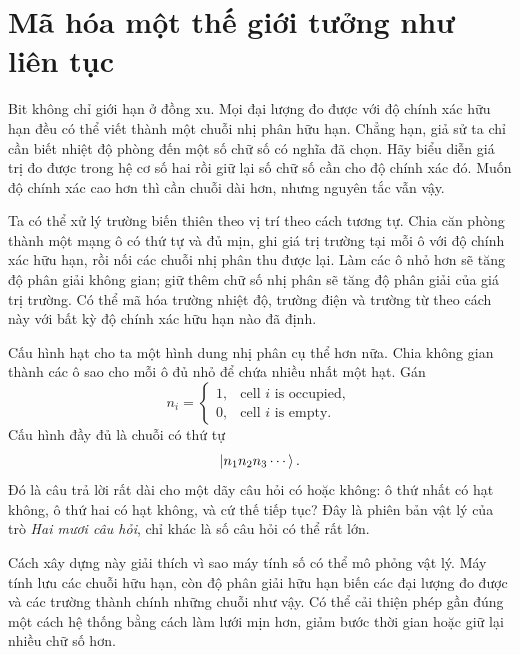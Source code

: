 \section{Mã hóa một thế giới tưởng như liên tục}

Bit không chỉ giới hạn ở đồng xu. Mọi đại lượng đo được với độ chính xác hữu hạn đều có thể viết thành một chuỗi nhị phân hữu hạn. Chẳng hạn, giả sử ta chỉ cần biết nhiệt độ phòng đến một số chữ số có nghĩa đã chọn. Hãy biểu diễn giá trị đo được trong hệ cơ số hai rồi giữ lại số chữ số cần cho độ chính xác đó. Muốn độ chính xác cao hơn thì cần chuỗi dài hơn, nhưng nguyên tắc vẫn vậy.

Ta có thể xử lý trường biến thiên theo vị trí theo cách tương tự. Chia căn phòng thành một mạng ô có thứ tự và đủ mịn, ghi giá trị trường tại mỗi ô với độ chính xác hữu hạn, rồi nối các chuỗi nhị phân thu được lại. Làm các ô nhỏ hơn sẽ tăng độ phân giải không gian; giữ thêm chữ số nhị phân sẽ tăng độ phân giải của giá trị trường. Có thể mã hóa trường nhiệt độ, trường điện và trường từ theo cách này với bất kỳ độ chính xác hữu hạn nào đã định.

Cấu hình hạt cho ta một hình dung nhị phân cụ thể hơn nữa. Chia không gian thành các ô sao cho mỗi ô đủ nhỏ để chứa nhiều nhất một hạt. Gán
\begin{equation}
  n_i=
  \begin{cases}
    1,&\text{cell \(i\) is occupied},\\
    0,&\text{cell \(i\) is empty}.
  \end{cases}
  \label{eq:l01-occupancy-bit}
\end{equation}
Cấu hình đầy đủ là chuỗi có thứ tự
\begin{equation}
  \left\lvert n_1n_2n_3\cdots\right\rangle.
\end{equation}
Đó là câu trả lời rất dài cho một dãy câu hỏi có hoặc không: ô thứ nhất có hạt không, ô thứ hai có hạt không, và cứ thế tiếp tục? Đây là phiên bản vật lý của trò \emph{Hai mươi câu hỏi}, chỉ khác là số câu hỏi có thể rất lớn.

Cách xây dựng này giải thích vì sao máy tính số có thể mô phỏng vật lý. Máy tính lưu các chuỗi hữu hạn, còn độ phân giải hữu hạn biến các đại lượng đo được và các trường thành chính những chuỗi như vậy. Có thể cải thiện phép gần đúng một cách hệ thống bằng cách làm lưới mịn hơn, giảm bước thời gian hoặc giữ lại nhiều chữ số hơn.

\begin{classroomqa}
\end{classroomqa}

